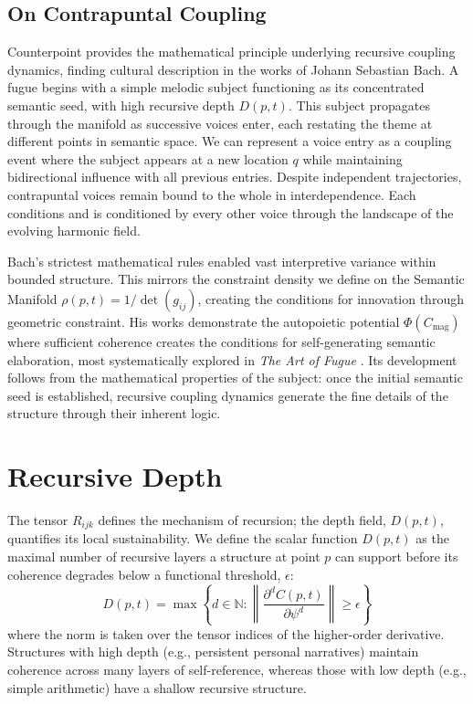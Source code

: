 \subsection{On Contrapuntal Coupling}\label{sec:on_contrapuntal_coupling}

Counterpoint provides the mathematical principle underlying recursive coupling dynamics, finding cultural description in the works of Johann Sebastian Bach. A fugue begins with a simple melodic subject functioning as its concentrated semantic seed, with high recursive depth \(D(p,t)\). This subject propagates through the manifold as successive voices enter, each restating the theme at different points in semantic space. We can represent a voice entry as a coupling event where the subject appears at a new location \(q\) while maintaining bidirectional influence with all previous entries. Despite independent trajectories, contrapuntal voices remain bound to the whole in interdependence. Each conditions and is conditioned by every other voice through the landscape of the evolving harmonic field.

Bach's strictest mathematical rules enabled vast interpretive variance within bounded structure. This mirrors the constraint density we define on the Semantic Manifold \(\rho(p,t) = 1/\det(g_{ij})\), creating the conditions for innovation through geometric constraint. His works demonstrate the autopoietic potential \(\Phi(C_{\text{mag}})\) where sufficient coherence creates the conditions for self-generating semantic elaboration, most systematically explored in \textit{The Art of Fugue} \autocite{Bach1751}. Its development follows from the mathematical properties of the subject: once the initial semantic seed is established, recursive coupling dynamics generate the fine details of the structure through their inherent logic.


\section{Recursive Depth}\label{sec:recursive_depth}

The tensor \(R_{ijk}\) defines the mechanism of recursion; the depth field, \(D(p, t)\), quantifies its local sustainability. We define the scalar function \(D(p,t)\) as the maximal number of recursive layers a structure at point \(p\) can support before its coherence degrades below a functional threshold, \(\epsilon\):
\begin{equation}
D(p, t) = \max \left\{ d \in \mathbb{N} : \left\| \frac{\partial^d C(p,t)}{\partial \psi^d} \right\| \geq \epsilon \right\}
\end{equation}
where the norm is taken over the tensor indices of the higher-order derivative. Structures with high depth (e.g., persistent personal narratives) maintain coherence across many layers of self-reference, whereas those with low depth (e.g., simple arithmetic) have a shallow recursive structure.

